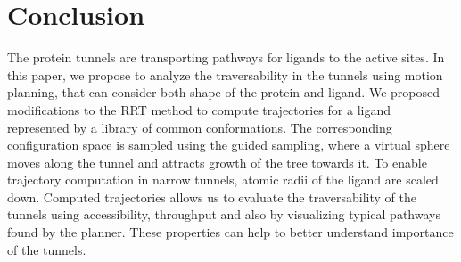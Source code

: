 \documentclass[usletter, 10pt, conference]{ieeeconf} %
\def\dt{d_{tunnel}}
\def\RI{R_{init}}
\def\rv{R_{tunnel}}
\def\L{\mathcal{L}}
\begin{document}




\section{Conclusion }
The protein tunnels are transporting pathways for ligands to the  active sites.
In this paper, we propose to analyze the traversability in the tunnels using motion planning, that can consider both shape
of the protein and ligand.
We proposed modifications to the RRT method to compute trajectories for a ligand represented by a library of common conformations.
The corresponding configuration space is sampled using the guided sampling, where a virtual sphere moves along the tunnel and attracts growth
of the tree towards it.
To enable trajectory computation in narrow tunnels, atomic radii of the ligand are scaled down.
Computed trajectories allows us to evaluate the traversability of the tunnels using
accessibility, throughput and also by visualizing typical pathways found by the planner.
These properties can help to better understand importance of the tunnels.




\end{document}
